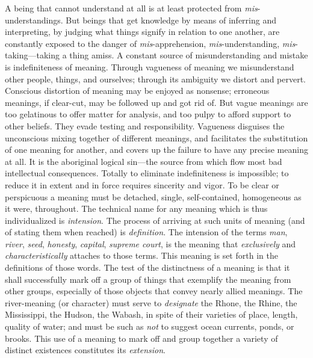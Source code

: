 \documentclass[showtrims,ustradepaper]{memoir}
\begin{document}
A being that cannot understand at all is at least protected from
\emph{mis}-understandings. But beings that get knowledge by means of
inferring and interpreting, by judging what things signify in relation
to one another, are constantly exposed to the danger of
\emph{mis}-apprehension, \emph{mis}-understanding,
\emph{mis}-taking---taking a thing amiss. A constant source of
misunderstanding and mistake is indefiniteness of meaning. Through
vagueness
of
meaning we misunderstand other people, things, and ourselves; through
its ambiguity we distort and pervert. Conscious distortion of meaning
may be enjoyed as nonsense; erroneous meanings, if clear-cut, may be
followed up and got rid of. But vague meanings are too gelatinous to
offer matter for analysis, and too pulpy to afford support to other
beliefs. They evade testing and responsibility. Vagueness disguises the
unconscious mixing together of different meanings, and facilitates the
substitution of one meaning for another, and covers up the failure to
have any precise meaning at all. It is the aboriginal logical sin---the
source from which flow most bad intellectual consequences. Totally to
eliminate indefiniteness is impossible; to reduce it in extent and in
force requires sincerity and vigor. To be clear or perspicuous a meaning
must be detached, single, self-contained, homogeneous as it were,
throughout. The technical name for any meaning which is thus
individualized is \emph{intension}. The process of arriving at such
units of meaning (and of stating them when reached) is
\emph{definition}. The intension of the terms \emph{man}, \emph{river},
\emph{seed}, \emph{honesty}, \emph{capital}, \emph{supreme court}, is
the meaning that \emph{exclusively} and \emph{characteristically}
attaches to those terms. This meaning is set forth in the definitions of
those words. The test of the distinctness of a meaning is that it shall
successfully mark off a group of things that exemplify the meaning from
other groups, especially of those objects that convey nearly allied
meanings. The river-meaning (or character) must serve to
\emph{designate} the Rhone, the Rhine, the Mississippi, the Hudson, the
Wabash, in spite of their varieties of place, length, quality of water;
and must be such as \emph{not} to suggest ocean currents, ponds, or
brooks. This use of a
meaning
to mark off and group together a variety of distinct existences
constitutes its \emph{extension}.

\end{document}
